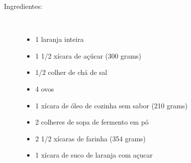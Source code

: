 \documentclass [11pt, letterpaper] {article}
\begin{document}
\begin {description}

\item [Ingredientes:] \ \\
\begin {itemize}
\item 1 laranja inteira
\item 1 1/2 xícara de açúcar (300 grams)
\item 1/2 colher de chá de sal
\item 4 ovos
\item 1 xícara de óleo de cozinha sem sabor (210 grams)
\item 2 colheres de sopa de fermento em pó
\item 2 1/2 xícaras de farinha (354 grams)
\item 1 xícara de suco de laranja com açucar
\end {itemize}



\end{description}
\end{document}
